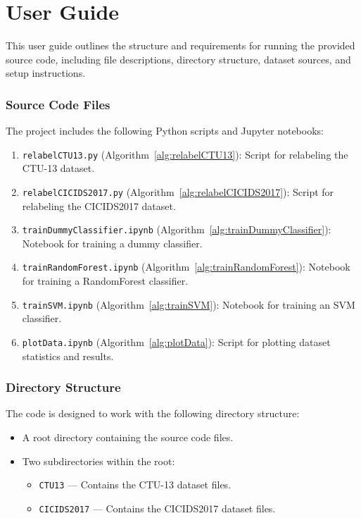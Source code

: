 \chapter{User Guide}\label{chap:user-guide}

This user guide outlines the structure and requirements for running the provided source code, including file descriptions, directory structure, dataset sources, and setup instructions.

\subsection{Source Code Files}

The project includes the following Python scripts and Jupyter notebooks:

\begin{enumerate}
    \item \texttt{relabelCTU13.py} (Algorithm~\ref{alg:relabelCTU13}): Script for relabeling the CTU-13 dataset.
    \item \texttt{relabelCICIDS2017.py} (Algorithm~\ref{alg:relabelCICIDS2017}): Script for relabeling the CICIDS2017 dataset.
    \item \texttt{trainDummyClassifier.ipynb} (Algorithm~\ref{alg:trainDummyClassifier}): Notebook for training a dummy classifier.
    \item \texttt{trainRandomForest.ipynb} (Algorithm~\ref{alg:trainRandomForest}): Notebook for training a RandomForest classifier.
    \item \texttt{trainSVM.ipynb} (Algorithm~\ref{alg:trainSVM}): Notebook for training an SVM classifier.
    \item \texttt{plotData.ipynb} (Algorithm~\ref{alg:plotData}): Script for plotting dataset statistics and results.
\end{enumerate}

\subsection{Directory Structure}

The code is designed to work with the following directory structure:

\begin{itemize}
    \item A root directory containing the source code files.
    \item Two subdirectories within the root:
    \begin{itemize}
        \item \texttt{CTU13} --- Contains the CTU-13 dataset files.
        \item \texttt{CICIDS2017} --- Contains the CICIDS2017 dataset files.
    \end{itemize}
\end{itemize}

